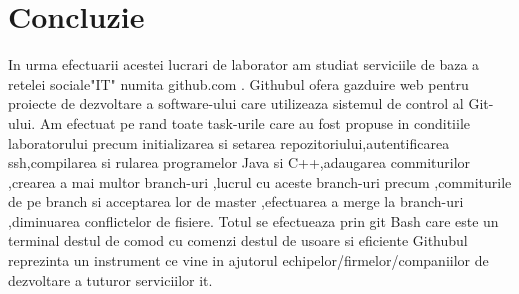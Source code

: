 \section*{Concluzie}
In urma efectuarii acestei lucrari de laborator am studiat serviciile de baza a retelei sociale"IT" numita github.com . Githubul ofera gazduire web pentru proiecte de dezvoltare a software-ului care utilizeaza sistemul de control al Git-ului.
Am efectuat pe rand toate task-urile care au fost propuse in conditiile laboratorului precum initializarea  si setarea repozitoriului,autentificarea ssh,compilarea si rularea programelor Java si C++,adaugarea commiturilor ,crearea a mai multor branch-uri ,lucrul cu aceste branch-uri precum ,commiturile de pe branch si acceptarea lor de master ,efectuarea a merge la branch-uri ,diminuarea conflictelor de fisiere.
Totul se efectueaza prin git Bash care este un terminal destul de comod cu comenzi destul de usoare si eficiente
Githubul reprezinta un instrument ce vine in ajutorul echipelor/firmelor/companiilor de dezvoltare a tuturor serviciilor it.



\clearpage